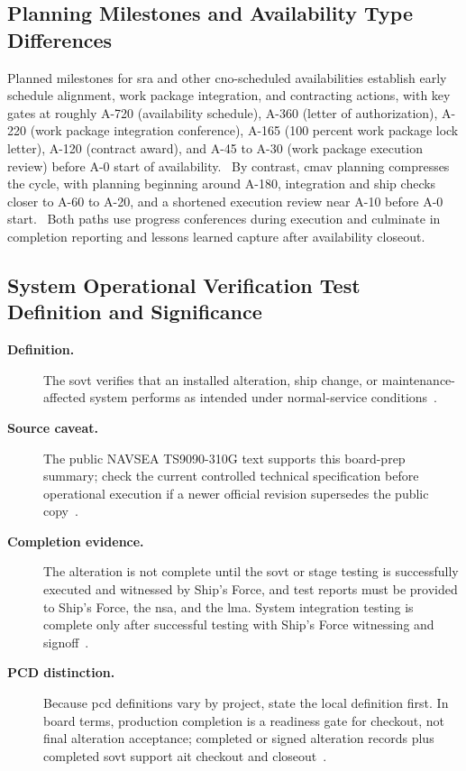 \documentclass[../main.tex]{subfiles}
\begin{document}
\subsection{Planning Milestones and Availability Type Differences}
Planned milestones for \ac{sra} and other \ac{cno}-scheduled availabilities establish early schedule alignment, work package integration, and contracting actions, with key gates at roughly A-720 (availability schedule), A-360 (letter of authorization), A-220 (work package integration conference), A-165 (100 percent work package lock letter), A-120 (contract award), and A-45 to A-30 (work package execution review) before A-0 start of availability.~\autocite{COMFLTFORCOMINST4790-3,edo-4-2-1-cno-availability-planning-2025,edo-4-2-2-cno-availability-execution-2025} By contrast, \ac{cmav} planning compresses the cycle, with planning beginning around A-180, integration and ship checks closer to A-60 to A-20, and a shortened execution review near A-10 before A-0 start.~\autocite{COMFLTFORCOMINST4790-3,edo-4-2-1-cno-availability-planning-2025,edo-4-2-2-cno-availability-execution-2025} Both paths use progress conferences during execution and culminate in completion reporting and lessons learned capture after availability closeout.~\autocite{edo-4-2-2-cno-availability-execution-2025}

\subsection{System Operational Verification Test Definition and Significance}
\begin{description}
  \item[\textbf{Definition.}] The \ac{sovt} verifies that an installed alteration, ship change, or maintenance-affected
        system performs as intended under normal-service conditions~\autocite{TS9090-310}.
  \item[\textbf{Source caveat.}] The public NAVSEA TS9090-310G text supports this board-prep summary; check the
        current controlled technical specification before operational execution if a newer official revision supersedes
        the public copy~\autocite{TS9090-310}.
  \item[\textbf{Completion evidence.}] The alteration is not complete until the \ac{sovt} or stage testing is
        successfully executed and witnessed by Ship's Force, and test reports must be provided to Ship's Force, the
        \ac{nsa}, and the \ac{lma}. System integration testing is complete only after successful testing with Ship's
        Force witnessing and signoff~\autocite{TS9090-310}.
  \item[\textbf{PCD distinction.}] Because \ac{pcd} definitions vary by project, state the local definition first. In
        board terms, production completion is a readiness gate for checkout, not final alteration acceptance; completed
        or signed alteration records plus completed \ac{sovt} support \ac{ait} checkout and closeout~\autocite{edo-4-2-2-cno-availability-execution-2025,TS9090-310}.
\end{description}
\end{document}
